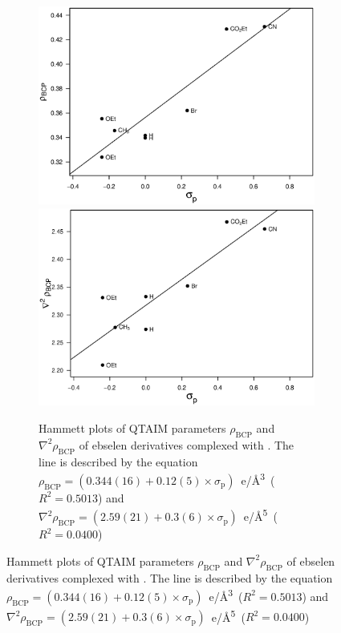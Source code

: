 \begin{refsection}
\begin{figure}
  \begin{subfigure}{\linewidth}
    \centering
    \includegraphics[width=0.45\linewidth]{Figures/hammett-rho-morph-p.eps}
    \includegraphics[width=0.45\linewidth]{Figures/hammett-lapl-morph-p.eps}
    \caption[Hammett plots of QTAIM parameters $\rho_\text{BCP}$ and $\nabla^2\rho_{\text{BCP}}$ of ebselen derivatives complexed with .]{Hammett plots of QTAIM parameters $\rho_\text{BCP}$ and $\nabla^2\rho_{\text{BCP}}$ of ebselen derivatives complexed with . The line is described by the equation $\rho_{\text{BCP}} = (0.344(16) + 0.12(5) \times \sigma_\text{p})$~e/\AA\textsuperscript{3}~($R^2=0.5013$) and $\nabla^2\rho_{\text{BCP}} = (2.59(21) + 0.3(6) \times \sigma_\text{p})$~e/\AA\textsuperscript{5}~($R^2=0.0400$)}\label{fig:hammett-qtaim-morph}
  \end{subfigure}
  

\end{figure}
\end{refsection}
